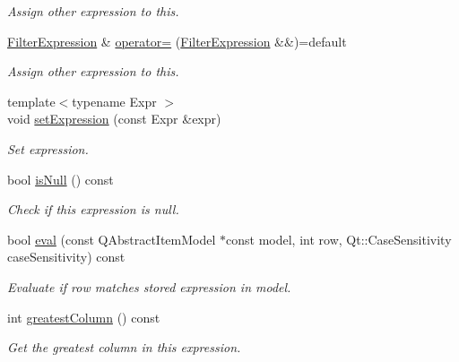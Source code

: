 \begin{DoxyCompactItemize}
\begin{DoxyCompactList}\small\item\em Assign other expression to this. \end{DoxyCompactList}\item 
\hyperlink{class_mdt_1_1_item_model_1_1_filter_expression}{Filter\+Expression} \& \hyperlink{class_mdt_1_1_item_model_1_1_filter_expression_a1692f9d77ba22d8b07a72a717802f54d}{operator=} (\hyperlink{class_mdt_1_1_item_model_1_1_filter_expression}{Filter\+Expression} \&\&)=default\hypertarget{class_mdt_1_1_item_model_1_1_filter_expression_a1692f9d77ba22d8b07a72a717802f54d}{}\label{class_mdt_1_1_item_model_1_1_filter_expression_a1692f9d77ba22d8b07a72a717802f54d}

\begin{DoxyCompactList}\small\item\em Assign other expression to this. \end{DoxyCompactList}\item 
{\footnotesize template$<$typename Expr $>$ }\\void \hyperlink{class_mdt_1_1_item_model_1_1_filter_expression_a2d6ddcef4483460923d9964c1a61231a}{set\+Expression} (const Expr \&expr)
\begin{DoxyCompactList}\small\item\em Set expression. \end{DoxyCompactList}\item 
bool \hyperlink{class_mdt_1_1_item_model_1_1_filter_expression_a42f096dd1b5fad93e52d75a39d077c66}{is\+Null} () const \hypertarget{class_mdt_1_1_item_model_1_1_filter_expression_a42f096dd1b5fad93e52d75a39d077c66}{}\label{class_mdt_1_1_item_model_1_1_filter_expression_a42f096dd1b5fad93e52d75a39d077c66}

\begin{DoxyCompactList}\small\item\em Check if this expression is null. \end{DoxyCompactList}\item 
bool \hyperlink{class_mdt_1_1_item_model_1_1_filter_expression_a88e6a9af1e0e340cec3faa2c9c52ffb3}{eval} (const Q\+Abstract\+Item\+Model $\ast$const model, int row, Qt\+::\+Case\+Sensitivity case\+Sensitivity) const 
\begin{DoxyCompactList}\small\item\em Evaluate if row matches stored expression in model. \end{DoxyCompactList}\item 
int \hyperlink{class_mdt_1_1_item_model_1_1_filter_expression_a0309a5f50c4417471589df184319b849}{greatest\+Column} () const \hypertarget{class_mdt_1_1_item_model_1_1_filter_expression_a0309a5f50c4417471589df184319b849}{}\label{class_mdt_1_1_item_model_1_1_filter_expression_a0309a5f50c4417471589df184319b849}

\begin{DoxyCompactList}\small\item\em Get the greatest column in this expression. \end{DoxyCompactList}\end{DoxyCompactItemize}


